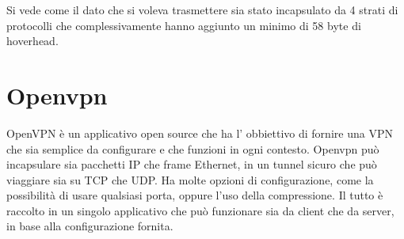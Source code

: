 Si vede come il dato che si voleva trasmettere sia stato incapsulato da 4 strati di protocolli che complessivamente hanno aggiunto un minimo di 58 byte di hoverhead.


\section{Openvpn}

OpenVPN è un applicativo open source che ha l' obbiettivo di fornire una VPN che sia semplice da configurare e che funzioni in ogni contesto. Openvpn può incapsulare sia pacchetti IP che frame Ethernet, in un tunnel sicuro che può viaggiare sia su TCP che UDP. Ha molte opzioni di configurazione, come la possibilità di usare qualsiasi porta, oppure l'uso della compressione. Il tutto è raccolto in un singolo applicativo che può funzionare sia da client che da server, in base alla configurazione fornita.

